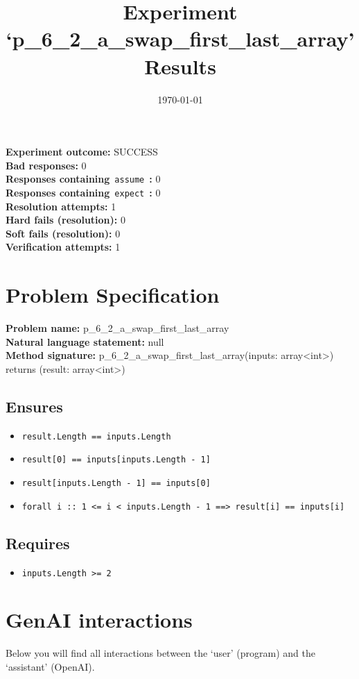 \documentclass{article}
\begin{document}
\title{Experiment `p\_6\_2\_a\_swap\_first\_last\_array' Results}
\author{\today}
\date{}
\maketitle
\textbf{Experiment outcome: }SUCCESS
\\\textbf{Bad responses: }0
\\\textbf{Responses containing}~\texttt{assume}~\textbf{: }0
\\\textbf{Responses containing}~\texttt{expect}~\textbf{: }0
\\\textbf{Resolution attempts: }1
\\\textbf{Hard fails (resolution): }0
\\\textbf{Soft fails (resolution): }0
\\\textbf{Verification attempts: }1
\section*{Problem Specification}
\textbf{Problem name: }p\_6\_2\_a\_swap\_first\_last\_array
\\\textbf{Natural language statement: }null
\\\textbf{Method signature: }p\_6\_2\_a\_swap\_first\_last\_array(inputs: array<int>) returns (result: array<int>)
\subsection*{Ensures}
\begin{itemize}
\item \texttt{result.Length == inputs.Length}
\item \texttt{result[0] == inputs[inputs.Length - 1]}
\item \texttt{result[inputs.Length - 1] == inputs[0]}
\item \texttt{forall i :: 1 <= i < inputs.Length - 1 ==> result[i] == inputs[i]}
\end{itemize}
\subsection*{Requires}
\begin{itemize}
\item \texttt{inputs.Length >= 2}
\end{itemize}
\clearpage
\section*{GenAI interactions}
Below you will find all interactions between the `user' (program) and the `assistant' (OpenAI).
\end{document}
